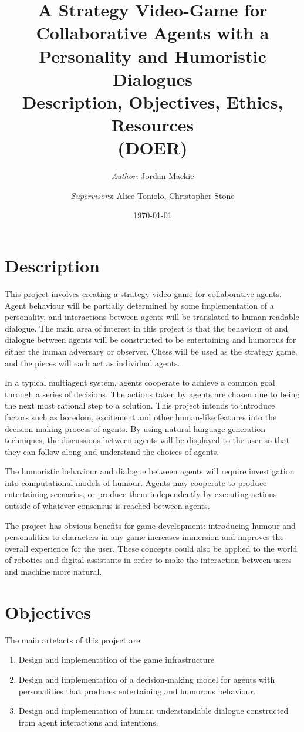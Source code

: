 \documentclass[12pt]{extarticle}
\title{%
  A Strategy Video-Game for Collaborative Agents with a Personality and Humoristic Dialogues \\
  \vspace{5mm} 
  \large Description, Objectives, Ethics, Resources \\
  (DOER)}
\author{\textit{Author}: Jordan Mackie \and 
{\textit{Supervisors}: Alice Toniolo, Christopher Stone}}
\date{\today}
\begin{document}
\maketitle


\section*{Description}

This project involves creating a strategy video-game for collaborative agents. Agent behaviour will be partially determined by some implementation of a personality, and interactions between agents will be translated to human-readable dialogue. The main area of interest in this project is that the behaviour of and dialogue between agents will be constructed to be entertaining and humorous for either the human adversary or observer. Chess will be used as the strategy game, and the pieces will each act as individual agents.

In a typical multiagent system, agents cooperate to achieve a common goal through a series of decisions. The actions taken by agents are chosen due to being the next most rational step to a solution. This project intends to introduce factors such as boredom, excitement and other human-like features into the decision making process of agents. By using natural language generation techniques, the discussions between agents will be displayed to the user so that they can follow along and understand the choices of agents.

The humoristic behaviour and dialogue between agents will require investigation into computational models of humour. Agents may cooperate to produce entertaining scenarios, or produce them independently by executing actions outside of whatever consensus is reached between agents.

The project has obvious benefits for game development: introducing humour and personalities to characters in any game increases immersion and improves the overall experience for the user. These concepts could also be applied to the world of robotics and digital assistants in order to make the interaction between users and machine more natural.

\section*{Objectives}

The main artefacts of this project are:
\begin{enumerate}
	\item Design and implementation of the game infrastructure
	\item Design and implementation of a decision-making model for agents with personalities that produces entertaining and humorous behaviour.
	\item Design and implementation of human understandable dialogue constructed from agent interactions and intentions.
\end{enumerate}
\end{document}
